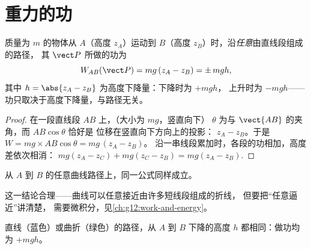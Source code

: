 \section{重力的功}

\begin{proposition}[重力的功]\label{prop:g11:work-of-force:weight}
质量为 $m$ 的物体从 $A$（高度 $z_A$）运动到
$B$（高度 $z_B$）时，沿\emph{任意}由直线段组成的路径，
其 $\vect P$ 所做的功为
\[
W_{AB}(\vect P) = mg\,(z_A - z_B) = \pm\, mgh ,
\]
其中 $h = \abs{z_A - z_B}$ 为高度下降量：下降时为 $+mgh$，
上升时为 $-mgh$——功只取决于高度下降量，与路径无关。
\end{proposition}

\begin{proof}
在一段直线段 $AB$ 上，（大小为 $mg$，竖直向下）
$\theta$ 为与 $\vect{AB}$ 的夹角，而 $AB\cos\theta$ 恰好是
位移在竖直向下方向上的投影：
$z_A - z_B$。于是 $W = mg \times AB\cos\theta = mg\,(z_A - z_B)$。
沿一串线段累加时，各段的功相加，高度差依次相消：
$mg(z_A - z_C) + mg(z_C - z_B) = mg(z_A - z_B)$.
\end{proof}

\begin{proposition}[任意路径]\label{prop:g11:work-of-force:anypath}
从 $A$ 到 $B$ 的任意曲线路径上，同一公式同样成立。
\end{proposition}
\admitted

\begin{remark}\label{rem:g11:work-of-force:anypath}
这一结论合理——曲线可以任意接近由许多短线段组成的折线，
但要把“任意逼近”讲清楚，
需要微积分，见\cref{ch:g12:work-and-energy}。
\end{remark}

\begin{omfigure}

{\small 直线（蓝色）或曲折（绿色）的路径，从 $A$
到 $B$ 下降的高度 $h$ 都相同：做功均为 $+mgh$。}
\end{omfigure}

